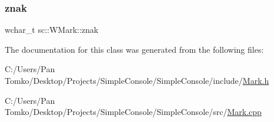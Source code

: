 \mbox{\label{classsc_1_1_w_mark_a0d33290f76e7088111fcea6a42e1646d}} 
\subsubsection{\texorpdfstring{znak}{znak}}
{\footnotesize\ttfamily wchar\+\_\+t sc\+::\+W\+Mark\+::znak}



The documentation for this class was generated from the following files\+:\begin{DoxyCompactItemize}
\item 
C\+:/\+Users/\+Pan Tomko/\+Desktop/\+Projects/\+Simple\+Console/\+Simple\+Console/include/\mbox{\hyperlink{_mark_8h}{Mark.\+h}}\item 
C\+:/\+Users/\+Pan Tomko/\+Desktop/\+Projects/\+Simple\+Console/\+Simple\+Console/src/\mbox{\hyperlink{_mark_8cpp}{Mark.\+cpp}}\end{DoxyCompactItemize}
